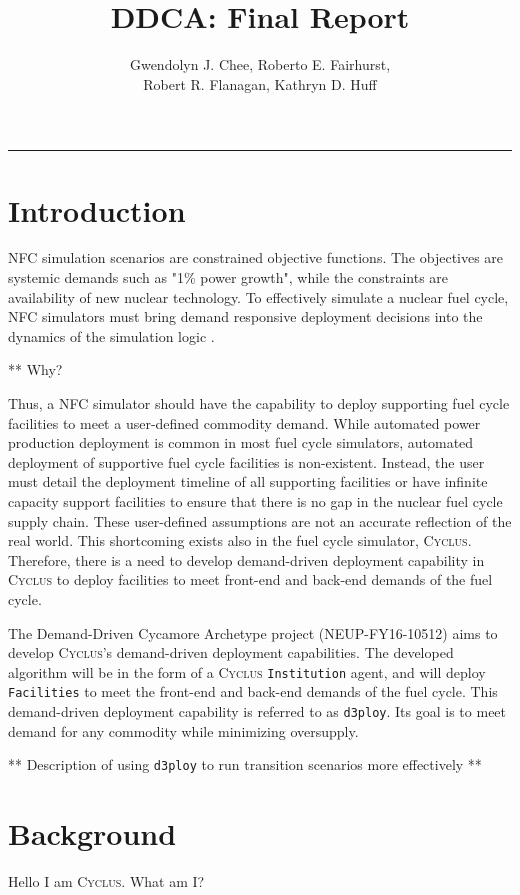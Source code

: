 \documentclass[11pt,letterpaper]{article}
\title{DDCA: Final Report}
\author{Gwendolyn J. Chee, Roberto E. Fairhurst, 
\\ \vspace{0.5em} Robert R. Flanagan, Kathryn D. Huff}
\newcommand{\Cyclus}{\textsc{Cyclus}\xspace}%
\newcommand{\deploy}{\texttt{d3ploy}\xspace}%
\begin{document}
	\maketitle
	\hrule

\section{Introduction}
\gls{NFC} simulation scenarios are constrained objective functions. 
The objectives are systemic demands such as "1\% power growth", 
while the constraints are availability of new nuclear technology.
To effectively simulate a nuclear fuel cycle, \gls{NFC} simulators 
must bring demand responsive deployment decisions into the dynamics
of the simulation logic \cite{huff_current_2017}. 

** Why? 

Thus, a \gls{NFC} simulator should have the capability to deploy 
supporting fuel cycle facilities to meet a user-defined commodity
demand. 
While automated power production deployment is common in most fuel
cycle simulators, automated deployment of supportive fuel cycle 
facilities is non-existent. 
Instead, the user must detail the deployment timeline of all 
supporting facilities or have infinite capacity support facilities
to ensure that there is no gap in the nuclear fuel cycle supply 
chain. 
These user-defined assumptions are not an accurate reflection 
of the real world. 
This shortcoming exists also in the fuel cycle simulator, \Cyclus. 
Therefore, there is a need to develop demand-driven deployment 
capability in \Cyclus to deploy facilities to meet front-end and 
back-end demands of the fuel cycle.

The Demand-Driven Cycamore Archetype project (NEUP-FY16-10512) 
aims to develop \Cyclus's demand-driven deployment capabilities. 
The developed algorithm will be in the form of a \Cyclus 
\texttt{Institution} agent, and will deploy \texttt{Facilities} 
to meet the front-end and back-end demands of the fuel cycle.
This demand-driven deployment capability is referred to as 
\deploy. 
Its goal is to meet demand for any commodity while minimizing 
oversupply. 

** Description of using \deploy to run transition scenarios more effectively ** 

\section{Background}
Hello I am \Cyclus. What am I? 
\end{document}
